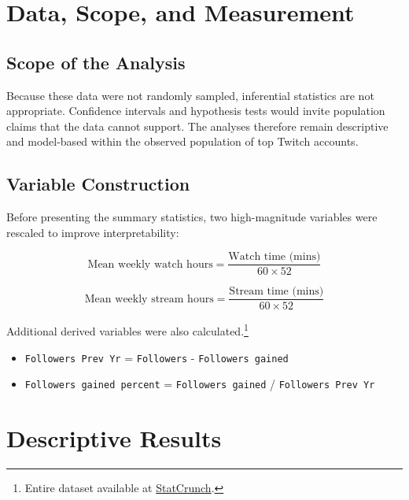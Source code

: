 \documentclass[11pt]{article}
\begin{document}
\section{Data, Scope, and Measurement}

\subsection{Scope of the Analysis}
Because these data were not randomly sampled, inferential statistics are not appropriate. Confidence intervals and hypothesis tests would invite population claims that the data cannot support. The analyses therefore remain descriptive and model-based within the observed population of top Twitch accounts.

\subsection{Variable Construction}
Before presenting the summary statistics, two high-magnitude variables were rescaled to improve interpretability:

\begin{equation}
\text{Mean weekly watch hours} = \frac{\text{Watch time (mins)}}{60 \times 52}
\end{equation}

\begin{equation}
\text{Mean weekly stream hours} = \frac{\text{Stream time (mins)}}{60 \times 52}
\end{equation}

Additional derived variables were also calculated.\footnote{Entire dataset available at \href{https://www.statcrunch.com/app/index.html?dataid=4597814&token=OTI3Z8\%2F0N6hSC1KVw9hTXmyjHLnuZvqCMyuxkgn1QRYPhIQfDVLUFClF3Y41ShOi4C\%2BMKL5\%2FHgpBTXKukjWOPGD4pN\%2FCkiobeyKouIjPB7LoPvHOTDN7wUNtPZQd2\%2BNjOwAtSMQl9aKQrbthjCSuuSihsliiTo0MvakPDYN0lwiE8N11ITBSTS9QJH9QgHEmO4ahoV6IkASuVdKosV\%2FJSQ\%3D\%3D}{StatCrunch}.}

\begin{itemize}
    \item \texttt{Followers Prev Yr} = \texttt{Followers} - \texttt{Followers gained}
    \item \texttt{Followers gained percent} = \texttt{Followers gained} / \texttt{Followers Prev Yr}
\end{itemize}

\section{Descriptive Results}
\end{document}
